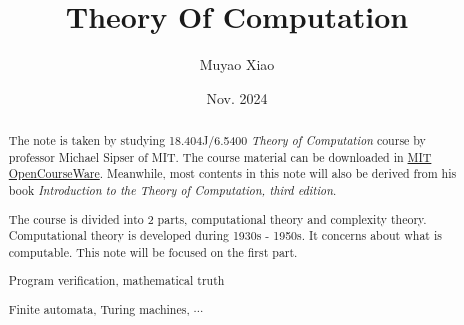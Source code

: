 \documentclass[a4paper]{report}
\title{Theory Of Computation}
\author{Muyao Xiao}
\date{Nov. 2024}
\begin{document}
\maketitle

\begin{abstract}
    The note is taken by studying 18.404J/6.5400 \textit{Theory of Computation} course by professor Michael Sipser of MIT. The course material can be downloaded in \href{https://ocw.mit.edu/courses/18-404j-theory-of-computation-fall-2020/}{MIT OpenCourseWare}. Meanwhile, most contents in this note will also be derived from his book \textit{Introduction to the Theory of Computation, third edition}.

    The course is divided into 2 parts, computational theory and complexity theory. Computational theory is developed during 1930s - 1950s. It concerns about what is computable. This note will be focused on the first part.

\begin{eg}
    Program verification, mathematical truth
\end{eg}

\begin{eg}
    Finite automata, Turing machines, \(\cdots\) 
\end{eg}
\end{abstract}

\tableofcontents


\pagestyle{plain}
\end{document}
